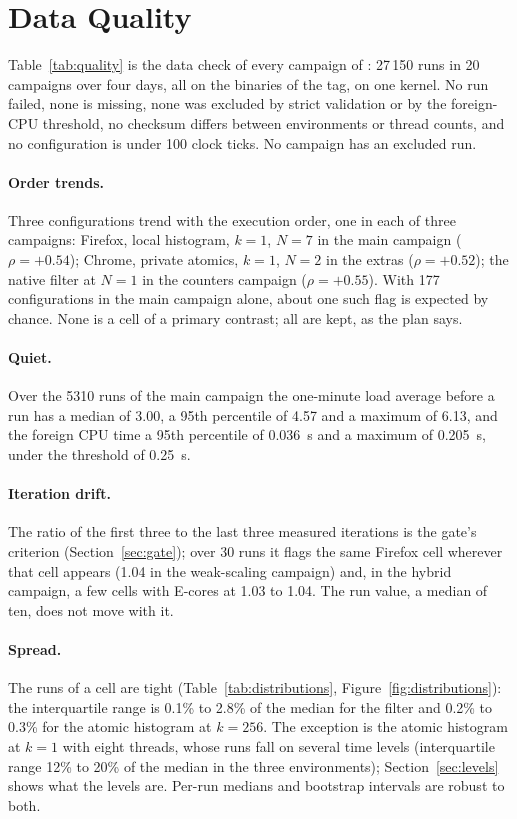 \section{Data Quality}
\label{sec:quality}



Table~\ref{tab:quality} is the data check of every campaign of
: 27\,150 runs in 20 campaigns over four days, all on the
binaries of the tag, on one kernel. No run failed, none is missing, none
was excluded by strict validation or by the foreign-CPU threshold, no
checksum differs between environments or thread counts, and no
configuration is under 100 clock ticks. No campaign has an excluded run.

\paragraph{Order trends.} Three configurations trend with the execution
order, one in each of three campaigns: Firefox, local histogram, $k=1$,
$N=7$ in the main campaign ($\rho=+0.54$); Chrome, private atomics, $k=1$,
$N=2$ in the extras ($\rho=+0.52$); the native filter at $N=1$ in the
counters campaign ($\rho=+0.55$). With 177 configurations in the main
campaign alone, about one such flag is expected by chance. None is a cell
of a primary contrast; all are kept, as the plan says.

\paragraph{Quiet.} Over the 5310 runs of the main campaign the one-minute
load average before a run has a median of 3.00, a 95th percentile of 4.57
and a maximum of 6.13, and the foreign CPU time a 95th percentile of
0.036~s and a maximum of 0.205~s, under the threshold of 0.25~s.

\paragraph{Iteration drift.} The ratio of the first three to the last three
measured iterations is the gate's criterion (Section~\ref{sec:gate}); over
30 runs it flags the same Firefox cell wherever that cell appears (1.04 in
the weak-scaling campaign) and, in the hybrid campaign, a few cells with
E-cores at 1.03 to 1.04. The run value, a median of ten, does not move with
it.

\paragraph{Spread.} The runs of a cell are tight
(Table~\ref{tab:distributions}, Figure~\ref{fig:distributions}): the
interquartile range is 0.1\% to 2.8\% of the median for the filter and
0.2\% to 0.3\% for the atomic histogram at $k=256$. The exception is the
atomic histogram at $k=1$ with eight threads, whose runs fall on several
time levels (interquartile range 12\% to 20\% of the median in the three
environments); Section~\ref{sec:levels} shows what the levels are. Per-run
medians and bootstrap intervals are robust to both.

